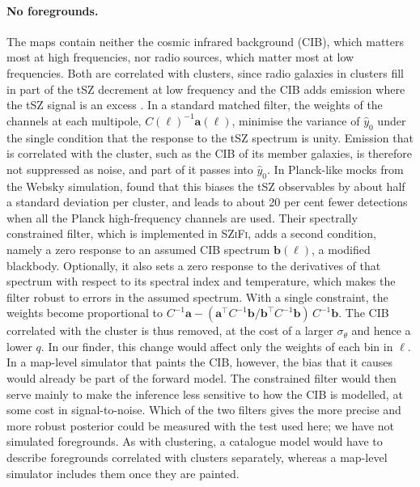 \paragraph*{No foregrounds.} The maps contain neither the cosmic infrared background (CIB), which matters
most at high frequencies, nor radio sources, which matter most at low frequencies. Both are correlated
with clusters, since radio galaxies in clusters fill in part of the tSZ decrement at low frequency
\citep{Gupta2017} and the CIB adds emission where the tSZ signal is an excess \citep{Melin2018}.
In a standard matched filter, the weights of the channels at each multipole, $C(\ell)^{-1}\bm a(\ell)$,
minimise the variance of $\hat y_0$ under the single condition that the response to the tSZ spectrum is
unity. Emission that is correlated with the cluster, such as the CIB of its member galaxies, is therefore
not suppressed as noise, and part of it passes into $\hat y_0$. In Planck-like mocks from the Websky
simulation, \citet{Zubeldia2023} found that this biases the tSZ observables by about half a standard
deviation per cluster, and leads to about 20 per cent fewer detections when all the Planck high-frequency
channels are used. Their spectrally constrained filter, which is implemented in \textsc{SZiFi}, adds a
second condition, namely a zero response to an assumed CIB spectrum $\bm b(\ell)$, a modified blackbody.
Optionally, it also sets a zero response to the derivatives of that spectrum with respect to its spectral
index and temperature, which makes the filter robust to errors in the assumed spectrum. With a single
constraint, the weights become proportional to $C^{-1}\bm a-(\bm a^{\top}C^{-1}\bm b/\bm b^{\top}C^{-1}\bm
b)\,C^{-1}\bm b$. The CIB correlated with the cluster is thus removed, at the cost of a larger
$\sigma_\theta$ and hence a lower $q$. In our finder, this change would affect only the weights of each
bin in $\ell$. In a map-level simulator that paints the CIB, however, the bias that it causes would
already be part of the forward model. The constrained filter would then serve mainly to make the
inference less sensitive to how the CIB is modelled, at some cost in signal-to-noise. Which of the two
filters gives the more precise and more robust posterior could be measured with the test used here;
we have not simulated foregrounds. As with clustering, a catalogue model would have to describe foregrounds correlated with clusters separately,
whereas a map-level simulator includes them once they are painted.

